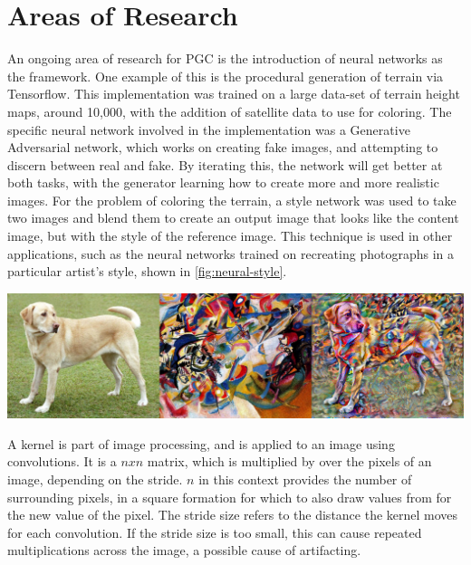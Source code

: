 \documentclass[10pt]{report}
\begin{document}

		\section{Areas of Research}
	
		An ongoing area of research for PGC is the introduction of neural networks as the framework. One example of this is the procedural generation of terrain via Tensorflow. This implementation was trained on a large data-set of terrain height maps, around 10,000, with the addition of satellite data to use for coloring. The specific neural network involved in the implementation was a Generative Adversarial network\cite{goodfellow2014generative}, which works on creating fake images, and attempting to discern between real and fake. By iterating this, the network will get better at both tasks, with the generator learning how to create more and more realistic images. For the problem of coloring the terrain, a style network was used to take two images and blend them to create an output image that looks like the content image, but with the style of the reference image. This technique is used in other applications, such as the neural networks trained on recreating photographs in a particular artist's style, shown in \autoref{fig:neural-style}. 
		
		\begin{minipage}{\textwidth}
			\centering
			\includegraphics[scale=.3]{stylized-image}
			\label{fig:neural-style}
		\end{minipage}
	
		A kernel is part of image processing, and is applied to an image using convolutions. It is a \(n x n\) matrix, which is multiplied by over the pixels of an image, depending on the stride. \(n\) in this context provides the number of surrounding pixels, in a square formation for which to also draw values from for the new value of the pixel. The stride size refers to the distance the kernel moves for each convolution. If the stride size is too small, this can cause repeated multiplications across the image, a possible cause of artifacting. 
	
\end{document}
